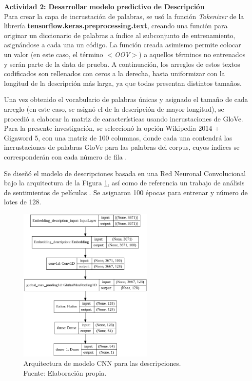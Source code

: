 \textbf{Actividad 2: Desarrollar modelo predictivo de Descripción}
\\
Para crear la capa de incrustación de palabras, se usó la función \textit{Tokenizer} de la librería \textbf{tensorflow.keras.preprocessing.text}, creando una función para originar un diccionario de palabras a índice al subconjunto de entrenamiento, asignándose a cada una un código. La función creada asimismo permite colocar un valor (en este caso, el término \textit{$<$OOV$>$}) a aquellos términos no entrenados y serán parte de la data de prueba. A continuación, los arreglos de estos textos codificados son rellenados con ceros a la derecha, hasta uniformizar con la longitud de la descripción más larga, ya que todas presentan distintos tamaños.

Una vez obtenido el vocabulario de palabras únicas y asignado el tamaño de cada arreglo (en este caso, se asignó el de la descripción de mayor longitud), se procedió a elaborar la matriz de características usando incrustaciones de GloVe. Para la presente investigación, se seleccionó la opción Wikipedia 2014 + Gigaword 5, con una matriz de 100 columnas, donde cada una contendrá las incrustaciones de palabras GloVe para las palabras del corpus, cuyos índices se corresponderán con cada número de fila \parencite{tec_malik2019pythonnlp}.

Se diseñó el modelo de descripciones basada en una Red Neuronal Convolucional bajo la arquitectura de la Figura \ref{4:fig27}, así como de referencia un trabajo de análisis de sentimientos de películas \parencite{tec_malik2019pythonnlp}. Se asignaron 100 épocas para entrenar y número de lotes de 128.

\begin{figure}[!ht]
	\begin{center}
		\includegraphics[width=0.60\textwidth]{4/figures/model_cnn_description.png}
		\caption[Arquitectura de modelo CNN para las descripciones]{Arquitectura de modelo CNN para las descripciones.\\
			Fuente: Elaboración propia.}
		\label{4:fig27}
	\end{center}
\end{figure}

